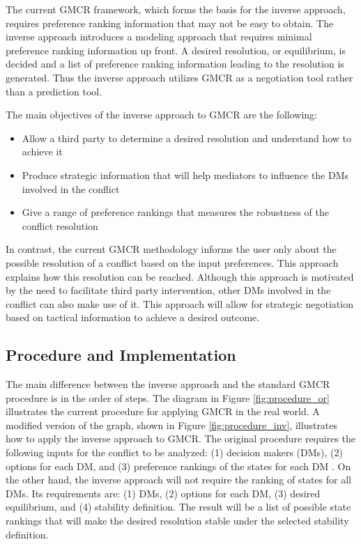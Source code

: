 \documentclass[letterpaper,12pt,titlepage,oneside,final]{book}
\begin{document}
The current GMCR framework, which forms the basis for the inverse approach, requires preference ranking information that may not be easy to obtain. The inverse approach introduces a modeling approach that requires minimal preference ranking information up front. A desired resolution, or equilibrium, is decided and a list of preference ranking information leading to the resolution is generated. Thus the inverse approach utilizes GMCR as a negotiation tool rather than a prediction tool.

The main objectives of the inverse approach to GMCR are the following:
\begin{itemize}
\item Allow a third party to determine a desired resolution and understand how to achieve it
\item Produce strategic information that will help mediators to influence the DMs involved in the conflict
\item Give a range of preference rankings that measures the robustness of the conflict resolution
\end{itemize}

In contrast, the current GMCR methodology informs the user only about the possible resolution of a conflict based on the input preferences. This approach explains how this resolution can be reached. Although this approach is motivated by the need to facilitate third party intervention, other DMs involved in the conflict can also make use of it. This approach will allow for strategic negotiation based on tactical information to achieve a desired outcome.



\subsection{Procedure and Implementation}

The main difference between the inverse approach and the standard GMCR procedure is in the order of steps. The diagram in Figure \ref{fig:procedure_or} illustrates the current procedure for applying GMCR in the real world. A modified version of the graph, shown in Figure \ref{fig:procedure_inv}, illustrates how to apply the inverse approach to GMCR. The original procedure requires the following inputs for the conflict to be analyzed: (1) decision makers (DMs), (2) options for each DM, and (3) preference rankings of the states for each DM \citep{Fang1989,fang1993}. On the other hand, the inverse approach will not require the ranking of states for all DMs. Its requirements are: (1) DMs, (2) options for each DM, (3) desired equilibrium, and (4) stability definition. The result will be a list of possible state rankings that will make the desired resolution stable under the selected stability definition.
\end{document}
